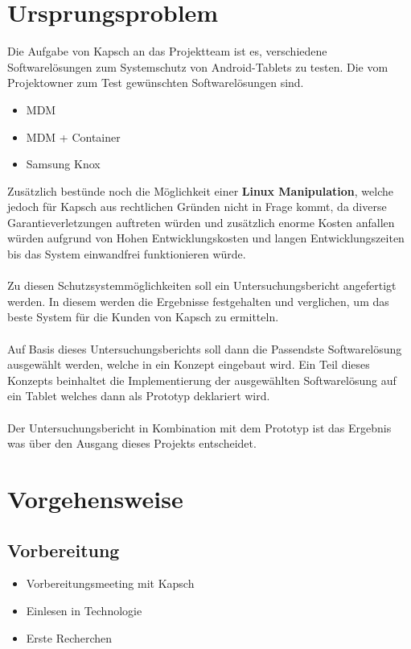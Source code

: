 \section{Ursprungsproblem}
Die Aufgabe von Kapsch an das Projektteam ist es, verschiedene Softwarelösungen zum Systemschutz von Android-Tablets zu testen. Die vom Projektowner zum Test gewünschten Softwarelösungen sind.
\begin{itemize}
	\item MDM
	\item MDM + Container
	\item Samsung Knox
\end{itemize}
Zusätzlich bestünde noch die Möglichkeit einer \textbf {Linux Manipulation}, welche jedoch für Kapsch aus rechtlichen Gründen nicht in Frage kommt, da diverse Garantieverletzungen auftreten würden und zusätzlich enorme Kosten anfallen würden aufgrund von Hohen Entwicklungskosten und langen Entwicklungszeiten bis das System einwandfrei funktionieren würde.
\paragraph*{}
Zu diesen Schutzsystemmöglichkeiten soll ein Untersuchungsbericht angefertigt werden. In diesem werden die Ergebnisse  festgehalten und verglichen, um das beste System für die Kunden von Kapsch zu ermitteln.
\paragraph*{}
Auf Basis dieses Untersuchungsberichts soll dann die Passendste Softwarelösung ausgewählt werden, welche in ein Konzept eingebaut wird. Ein Teil dieses Konzepts beinhaltet die Implementierung der ausgewählten Softwarelösung auf ein Tablet welches dann als Prototyp deklariert wird. 
\paragraph*{}
Der Untersuchungsbericht in Kombination mit dem Prototyp ist das Ergebnis was über den Ausgang dieses Projekts entscheidet.


\section{Vorgehensweise}
\subsection{Vorbereitung}
\begin{itemize}
	\item Vorbereitungsmeeting mit Kapsch
	\item Einlesen in Technologie
	\item Erste Recherchen
\end{itemize}
